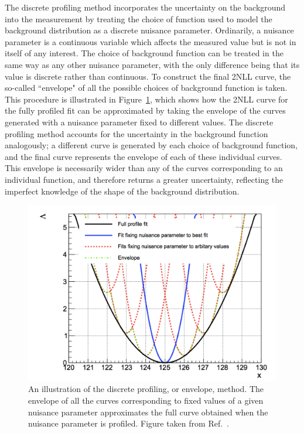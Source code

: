 The discrete profiling method incorporates the uncertainty on the background 
into the measurement by treating the choice of function used to model the background distribution
as a discrete nuisance parameter.
Ordinarily, a nuisance parameter is a continuous variable which affects the measured value 
but is not in itself of any interest.
The choice of background function can be treated in the same way as any other nuisance parameter, 
with the only difference being that its value is discrete rather than continuous.
To construct the final 2NLL curve, 
the so-called ``envelope" of all the possible choices of background function is taken.
This procedure is illustrated in Figure~\ref{fig:sigbkg_envelope}, 
which shows how the 2NLL curve for the fully profiled fit can be approximated 
by taking the envelope of the curves generated with a nuisance parameter fixed to different values.
The discrete profiling method accounts for the uncertainty in the background function analogously;
a different curve is generated by each choice of background function, 
and the final curve represents the envelope of each of these individual curves.
This envelope is necessarily wider than any of the curves corresponding to an individual function, 
and therefore returns a greater uncertainty, 
reflecting the imperfect knowledge of the shape of the background distribution.

\begin{figure}[hptb]
 \centering
 \includegraphics[width=\textwidth]{Figures/SigBkg/EnvelopeIllustration.pdf}
 \caption[Illustration of the discrete profiling method.]
 {
   An illustration of the discrete profiling, or envelope, method.
   The envelope of all the curves corresponding to fixed values of a given nuisance parameter
   approximates the full curve obtained when the nuisance parameter is profiled.
   Figure taken from Ref.~\cite{Envelope}.
 }
 \label{fig:sigbkg_envelope}
\end{figure}

